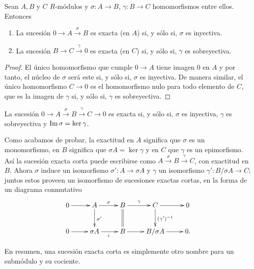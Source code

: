 \begin{proposicion}
	Sean $A,B$ y $C$ $R$-módulos y $\sigma: A \rightarrow B$, $\gamma: B \rightarrow C$ homomorfismos entre ellos. Entonces
	\begin{enumerate}
		\item La sucesión $0 \to A \overset{\sigma}{\to} B$ es exacta (en $A$) si, y sólo si,
		      $\sigma$ es inyectiva.
		\item La sucesión $B \to C \overset{\gamma}{\to} 0$ es exacta (en $C$) si, y sólo si,
		      $\gamma$ es sobreyectiva.
	\end{enumerate}
\end{proposicion}
\begin{proof}
	El único homomorfismo que cumple $0 \to A$ tiene imagen $0$ en $A$ y por tanto, el núcleo de $\sigma$ será este si, y sólo si, $\sigma$ es inyectiva. De manera similar, el único homomorfismo $C \to 0$ es el homomorfismo nulo para todo elemento de $C$, que es la imagen de $\gamma$ si, y sólo si, $\gamma$ es sobreyectiva.
\end{proof}
\begin{corolario}
	La sucesión $0 \rightarrow A \xrightarrow{\sigma} B \xrightarrow{\gamma} C \rightarrow 0$ es exacta si, y sólo si, $\sigma$ es inyectiva, $\gamma$ es sobreyectiva y $\operatorname{Im} \sigma = \ker \gamma$.
\end{corolario}

Como acabamos de probar, la exactitud en \(A\) significa que \(\sigma\) es un
monomorfismo, en \(B\) significa que \(\sigma A = \ker \gamma\) y en \(C\) que
\(\gamma\) es un epimorfismo. Así la sucesión exacta corta puede escribirse
como \(A \xrightarrow{\sigma} B \xrightarrow{\gamma} C\), con exactitud en
\(B\). Ahora \(\sigma\) induce un isomorfismo \(\sigma': A \to \sigma A\) y \(\gamma\)
un isomorfismo \(\gamma': B/\sigma A \to C\); juntos estos proveen un
isomorfismo de sucesiones exactas cortas, en la forma de un diagrama
conmutativo
\begin{equation}
	\label{exactshortseq-equiv}
	\xymatrix{
	0 \ar[r] & A \ar[r]^{\sigma} \ar[d]^{\sigma'} & B \ar[r]^\gamma \ar@{=}[d] & C \ar[r] \ar[d]^{(\gamma')^{-1}} & 0 \\
	0 \ar[r] & \sigma A \ar[r]_i & B \ar[r] & B/\sigma A \ar[r] & 0.
	}
\end{equation}

En resumen, una sucesión exacta corta es simplemente otro nombre para un
submódulo y su cociente.

